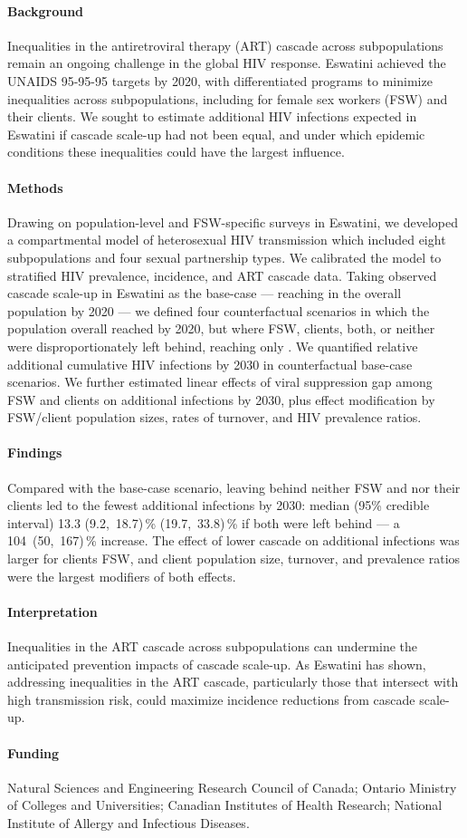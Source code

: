 \paragraph{Background}
Inequalities in the antiretroviral therapy (ART) cascade across subpopulations
remain an ongoing challenge in the global HIV response.
Eswatini achieved the UNAIDS 95-95-95 targets by 2020,
with differentiated programs to minimize inequalities across subpopulations,
including for female sex workers (FSW) and their clients.
We sought to estimate additional HIV infections expected in Eswatini
if cascade scale-up had not been equal,
and under which epidemic conditions these inequalities could have the largest influence.
\paragraph{Methods}
Drawing on population-level and FSW-specific surveys in Eswatini,
we developed a compartmental model of heterosexual HIV transmission
which included eight subpopulations and four sexual partnership types.
We calibrated the model to stratified HIV prevalence, incidence, and ART cascade data.
Taking observed cascade scale-up in Eswatini as the base-case
--- reaching \cashi in the overall population by 2020 ---
we defined four counterfactual scenarios in which
the population overall reached \casmd by 2020,
but where FSW, clients, both, or neither
were disproportionately left behind, reaching only \caslo.
We quantified relative additional cumulative HIV infections by 2030
in counterfactual \vs base-case scenarios.
We further estimated linear effects of
viral suppression gap among FSW and clients on additional infections by 2030, plus
effect modification by FSW/client population sizes, rates of turnover, and HIV prevalence ratios.
\paragraph{Findings}
Compared with the base-case scenario, leaving behind neither FSW and nor their clients
led to the fewest additional infections by 2030: median (95\% credible interval)
13.3 (9.2,~18.7)\,\%  (19.7,~33.8)\,\% if both were left behind
--- a 104~(50,~167)\,\% increase.
The effect of lower cascade on additional infections was larger for clients \vs FSW, and
client population size, turnover, and prevalence ratios were the largest modifiers of both effects.
\paragraph{Interpretation}
Inequalities in the ART cascade across subpopulations
can undermine the anticipated prevention impacts of cascade scale-up.
As Eswatini has shown,
addressing inequalities in the ART cascade,
particularly those that intersect with high transmission risk,
could maximize incidence reductions from cascade scale-up.
\paragraph{Funding}
Natural Sciences and Engineering Research Council of Canada;
Ontario Ministry of Colleges and Universities;
Canadian Institutes of Health Research;
National Institute of Allergy and Infectious Diseases.
